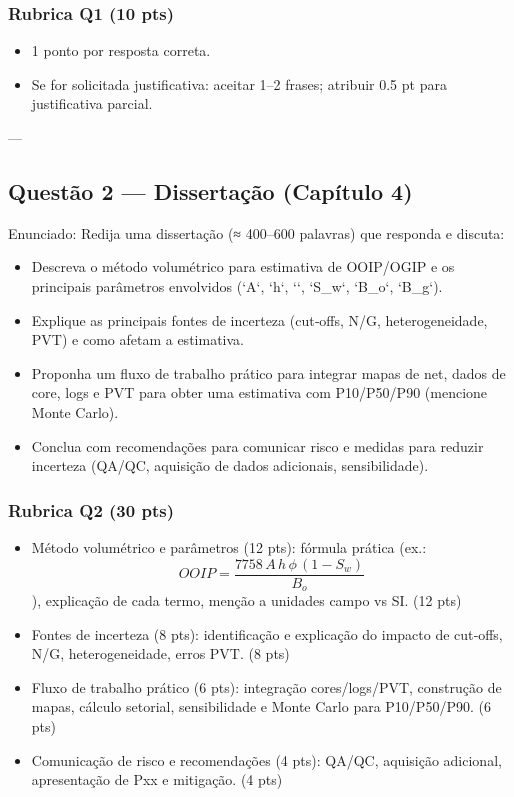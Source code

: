 \documentclass[11pt,a4paper]{article}
\begin{document}
\subsubsection{Rubrica Q1 (10 pts)}
\begin{itemize}
\item 1 ponto por resposta correta.
\item Se for solicitada justificativa: aceitar 1–2 frases; atribuir 0.5 pt para justificativa parcial.
\end{itemize}

---

\subsection{Questão 2 — Dissertação (Capítulo 4)}

Enunciado:
Redija uma dissertação (≈ 400–600 palavras) que responda e discuta:
\begin{itemize}
\item Descreva o método volumétrico para estimativa de OOIP/OGIP e os principais parâmetros envolvidos (`A`, `h`, `\phi`, `S_w`, `B_o`, `B_g`).
\item Explique as principais fontes de incerteza (cut‑offs, N/G, heterogeneidade, PVT) e como afetam a estimativa.
\item Proponha um fluxo de trabalho prático para integrar mapas de net, dados de core, logs e PVT para obter uma estimativa com P10/P50/P90 (mencione Monte Carlo).
\item Conclua com recomendações para comunicar risco e medidas para reduzir incerteza (QA/QC, aquisição de dados adicionais, sensibilidade).
\end{itemize}

\subsubsection{Rubrica Q2 (30 pts)}
\begin{itemize}
\item Método volumétrico e parâmetros (12 pts): fórmula prática (ex.: $$OOIP=\dfrac{7758\,A\,h\,\phi\,(1-S_w)}{B_o}$$), explicação de cada termo, menção a unidades campo vs SI. (12 pts)
\item Fontes de incerteza (8 pts): identificação e explicação do impacto de cut‑offs, N/G, heterogeneidade, erros PVT. (8 pts)
\item Fluxo de trabalho prático (6 pts): integração cores/logs/PVT, construção de mapas, cálculo setorial, sensibilidade e Monte Carlo para P10/P50/P90. (6 pts)
\item Comunicação de risco e recomendações (4 pts): QA/QC, aquisição adicional, apresentação de Pxx e mitigação. (4 pts)
\end{itemize}
\end{document}
